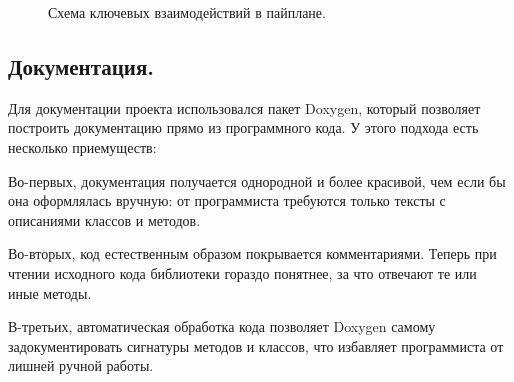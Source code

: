 \documentclass{article}
\begin{document}
\begin{center}
\begin{figure}[H]
\caption{Схема ключевых взаимодействий в пайплане.}
\label{ris:image}
\end{figure}
\end{center}

\newpage

\subsection{Документация.}

Для документации проекта использовался пакет Doxygen, который позволяет построить документацию прямо из программного кода. У этого подхода есть несколько приемуществ:

Во-первых, документация получается однородной и более красивой, чем если бы она оформлялась вручную: от программиста требуются только тексты с описаниями классов и методов.

Во-вторых, код естественным образом  покрывается комментариями. Теперь при чтении исходного кода библиотеки гораздо понятнее, за что отвечают те или иные методы.

В-третьих, автоматическая обработка кода позволяет Doxygen самому задокументировать сигнатуры методов и классов, что избавляет программиста от лишней ручной работы.
\end{document}
